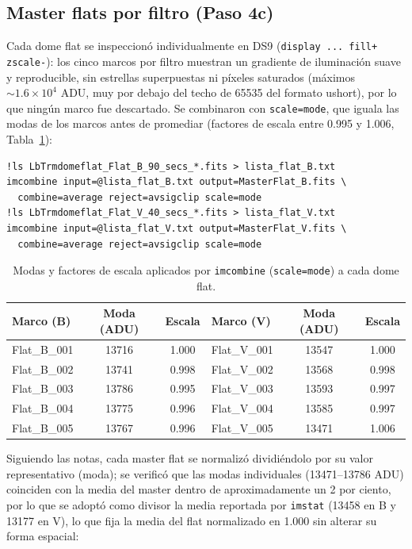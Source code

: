\documentclass[10pt,a4paper]{article}
\begin{document}
\subsection{Master flats por filtro (Paso 4c)}

Cada dome flat se inspeccionó individualmente en DS9
(\texttt{display ... fill+ zscale-}): los cinco marcos por filtro muestran un
gradiente de iluminación suave y reproducible, sin estrellas superpuestas ni
píxeles saturados (máximos $\sim 1.6\times10^{4}$ ADU, muy por debajo del
techo de 65535 del formato ushort), por lo que ningún marco fue descartado.
Se combinaron con \texttt{scale=mode}, que iguala las modas de los marcos
antes de promediar (factores de escala entre 0.995 y 1.006, Tabla~\ref{tab:modes}):

\begin{lstlisting}
!ls LbTrmdomeflat_Flat_B_90_secs_*.fits > lista_flat_B.txt
imcombine input=@lista_flat_B.txt output=MasterFlat_B.fits \
  combine=average reject=avsigclip scale=mode
!ls LbTrmdomeflat_Flat_V_40_secs_*.fits > lista_flat_V.txt
imcombine input=@lista_flat_V.txt output=MasterFlat_V.fits \
  combine=average reject=avsigclip scale=mode
\end{lstlisting}

\begin{table}[ht]
\centering
\caption{Modas y factores de escala aplicados por \texttt{imcombine}
(\texttt{scale=mode}) a cada dome flat.}
\label{tab:modes}
\footnotesize
\begin{tabular}{lcc|lcc}
\toprule
Marco (B) & Moda (ADU) & Escala & Marco (V) & Moda (ADU) & Escala \\
\midrule
Flat\_B\_001 & 13716 & 1.000 & Flat\_V\_001 & 13547 & 1.000 \\
Flat\_B\_002 & 13741 & 0.998 & Flat\_V\_002 & 13568 & 0.998 \\
Flat\_B\_003 & 13786 & 0.995 & Flat\_V\_003 & 13593 & 0.997 \\
Flat\_B\_004 & 13775 & 0.996 & Flat\_V\_004 & 13585 & 0.997 \\
Flat\_B\_005 & 13767 & 0.996 & Flat\_V\_005 & 13471 & 1.006 \\
\bottomrule
\end{tabular}
\end{table}

\noindent Siguiendo las notas, cada master flat se normalizó dividiéndolo por
su valor representativo (moda); se verificó que las modas individuales
(13471--13786 ADU) coinciden con la media del master dentro de aproximadamente un 2 por ciento,
por lo que se adoptó como divisor la media reportada por \texttt{imstat}
(13458 en B y 13177 en V), lo que fija la media del flat normalizado en
1.000 sin alterar su forma espacial:
\end{document}
